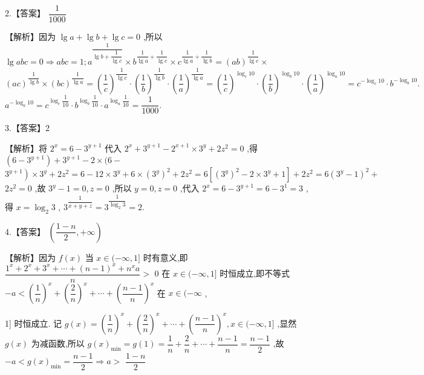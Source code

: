 \documentclass[10pt]{article}
\begin{document}
2.【答案】 $\dfrac{1}{1000}$

【解析】因为 $\lg a + \lg b + \lg c = 0$ ,所以 $\lg {abc} = 0 \Rightarrow  {abc} = 1;{a}^{\dfrac{1}{\lg b + \dfrac{1}{\lg c}}} \times  {b}^{\dfrac{1}{\lg a} + \dfrac{1}{\lg c}} \times  {c}^{\dfrac{1}{\lg a} + \dfrac{1}{\lg b}} = {\left( ab\right) }^{\dfrac{1}{\lg c}} \times$  ${\left( ac\right) }^{\dfrac{1}{\lg b}} \times  {\left( bc\right) }^{\dfrac{1}{\lg a}} = {\left( \dfrac{1}{c}\right) }^{\dfrac{1}{\lg c}} \cdot  {\left( \dfrac{1}{b}\right) }^{\dfrac{1}{\lg b}} \cdot  {\left( \dfrac{1}{a}\right) }^{\dfrac{1}{\lg a}} = {\left( \dfrac{1}{c}\right) }^{{\log }_{c}{10}} \cdot  {\left( \dfrac{1}{b}\right) }^{{\log }_{b}{10}} \cdot  {\left( \dfrac{1}{a}\right) }^{{\log }_{a}{10}} = {c}^{-{\log }_{c}{10}} \cdot  {b}^{-{\log }_{b}{10}}.$  ${a}^{-{\log }_{a}{10}} = {c}^{{\log }_{c}\dfrac{1}{10}} \cdot  {b}^{{\log }_{b}\dfrac{1}{10}} \cdot  {a}^{{\log }_{a}\dfrac{1}{10}} = \dfrac{1}{1000}.$

3.【答案】2

【解析】将 ${2}^{x} = 6 - {3}^{y + 1}$ 代入 ${2}^{x} + {3}^{y + 1} - {2}^{x + 1} \times  {3}^{y} + 2{z}^{2} = 0$ ,得 $\left( {6 - {3}^{y + 1}}\right)  + {3}^{y + 1} - 2 \times  (6 -$  $\left. {3}^{y + 1}\right)  \times  {3}^{y} + 2{z}^{2} = 6 - {12} \times  {3}^{y} + 6 \times  {\left( {3}^{y}\right) }^{2} + 2{z}^{2} = 6\left\lbrack  {{\left( {3}^{y}\right) }^{2} - 2 \times  {3}^{y} + 1}\right\rbrack   + 2{z}^{2} = 6{\left( {3}^{y} - 1\right) }^{2} +$  $2{z}^{2} = 0$ ,故 ${3}^{y} - 1 = 0,z = 0$ ,所以 $y = 0,z = 0$ ,代入 ${2}^{x} = 6 - {3}^{y + 1} = 6 - {3}^{1} = 3$ ,得 $x = {\log }_{2}3$ , ${3}^{\dfrac{1}{x + y + z}} = {3}^{\dfrac{1}{{\log }_{2}3}} = 2.$

4.【答案】 $\left( {\dfrac{1 - n}{2}, + \infty }\right)$

【解析】因为 $f\left( x\right)$ 当 $x \in  ( - \infty ,1\rbrack$ 时有意义,即 $\dfrac{{1}^{x} + {2}^{x} + {3}^{x} + \cdots  + {\left( n - 1\right) }^{x} + {n}^{x}a}{n} >$ 0 在 $x \in  ( - \infty ,1\rbrack$ 时恒成立,即不等式 $- a < {\left( \dfrac{1}{n}\right) }^{x} + {\left( \dfrac{2}{n}\right) }^{x} + \cdots  + {\left( \dfrac{n - 1}{n}\right) }^{x}$ 在 $x \in  ( - \infty$ ,

1] 时恒成立. 记 $g\left( x\right)  = {\left( \dfrac{1}{n}\right) }^{x} + {\left( \dfrac{2}{n}\right) }^{x} + \cdots  + {\left( \dfrac{n - 1}{n}\right) }^{x},x \in  ( - \infty ,1\rbrack$ ,显然 $g\left( x\right)$ 为减函数,所以 $g{\left( x\right) }_{\min } = g\left( 1\right)  = \dfrac{1}{n} + \dfrac{2}{n} + \cdots  + \dfrac{n - 1}{n} = \dfrac{n - 1}{2}$ ,故 $- a < g{\left( x\right) }_{\min } = \dfrac{n - 1}{2} \Rightarrow  a >$  $\dfrac{1 - n}{2}$
\end{document}
